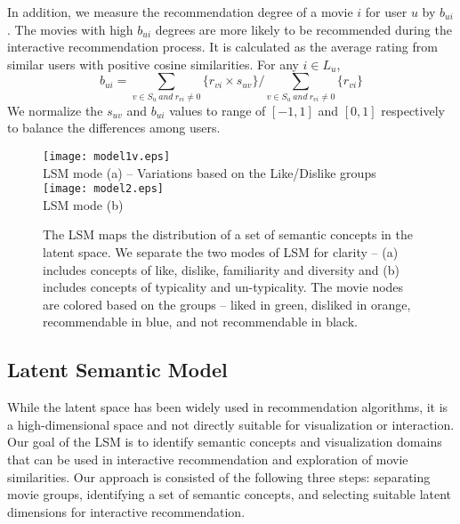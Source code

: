 \documentclass{vgtc}                          %
\begin{document}
In addition, we measure the recommendation degree of a movie $i$ for user $u$ by $b_{ui}$.
The movies with high $b_{ui}$ degrees are more likely to be recommended during the interactive recommendation process.
It is calculated as the average rating from similar users with positive cosine similarities. 
For any $i \in L_u$,
\begin{equation}
b_{ui} = \sum_{v \in S_u \ and \  r_{vi} \ne 0} \{r_{vi} \times 
s_{uv}\} / \sum_{v \in S_u \ and \ r_{vi} \ne 0} \{r_{vi}\}
\label{ratingScore}
\end{equation}
We normalize the $s_{uv}$ and $b_{ui}$ values to range of $[-1, 1]$ and $[0,1]$ respectively to balance the differences among users.


\begin{figure}
\centering
\texttt{[image: model1v.eps]}\\
LSM mode (a) -- Variations based on the Like/Dislike groups\\
\texttt{[image: model2.eps]}\\
LSM mode (b)
\caption{The LSM maps the distribution of a set of semantic concepts in the latent space.
We separate the two modes of LSM for clarity -- (a) includes concepts of like, dislike, familiarity and diversity and (b) includes concepts of typicality and un-typicality.
The movie nodes are colored based on the groups -- liked in green, disliked in orange, recommendable in blue, and not recommendable in black.
}
\label{svd}
\end{figure}

\subsection{Latent Semantic Model}

While the latent space has been widely used in recommendation algorithms, it is a high-dimensional space and not directly suitable for visualization or interaction. 
Our goal of the LSM is to identify semantic concepts and visualization domains that can be used in interactive recommendation and exploration of movie similarities.
Our approach is consisted of the following three steps: separating movie groups, identifying a set of semantic concepts, and selecting suitable latent dimensions for interactive recommendation.
\end{document}
